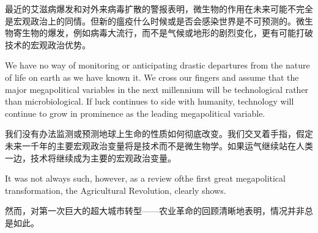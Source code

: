 \begin{Parallel}{97mm}{45mm}
  \ParallelRText
  {最近的艾滋病爆发和对外来病毒扩散的警报表明，微生物的作用在未来可能不完全是宏观政治上的同情。但新的瘟疫什么时候或是否会感染世界是不可预测的。微生物寄生物的爆发，例如病毒大流行，而不是气候或地形的剧烈变化，更有可能打破技术的宏观政治优势。}
  \ParallelPar



  \ParallelLText
  {We have no way of monitoring or anticipating drastic departures from the nature of life on earth as we have known it. We cross our fingers and assume that the major megapolitical variables in the next millennium will be technological rather than microbiological. If luck continues to side with humanity, technology will continue to grow in prominence as the leading megapolitical variable.}
  
  \ParallelRText
  {我们没有办法监测或预测地球上生命的性质如何彻底改变。我们交叉着手指，假定未来一千年的主要宏观政治变量将是技术而不是微生物学。如果运气继续站在人类一边，技术将继续成为主要的宏观政治变量。}
  \ParallelPar



  \ParallelLText
  {It was not always such, however, as a review ofthe first great megapolitical transformation, the Agricultural Revolution, clearly shows.}
  
  \ParallelRText
  {然而，对第一次巨大的超大城市转型——农业革命的回顾清晰地表明，情况并非总是如此。}
  \ParallelPar

\end{Parallel}